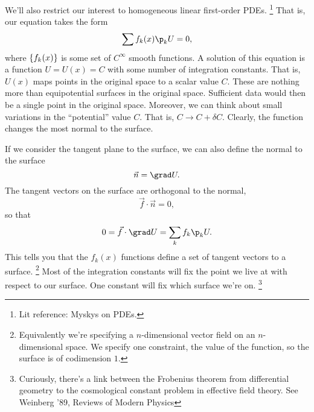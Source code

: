 We'll also restrict our interest to homogeneous linear first-order PDEs.%
    \footnote{Lit reference: Myskys on PDEs.}
That is, our equation takes the form
\begin{equation}
    \sum f_k(x) \p_k U = 0,
\end{equation}
where $\{f_k(x)\}$ is some set of $C^\infty$ smooth functions. A solution of this equation is a function $U=U(x)=C$ with some number of integration constants.
That is, $U(x)$ maps points in the original space to a scalar value $C$. These are nothing more than equipotential surfaces in the original space. Sufficient data would then be a single point in the original space. Moreover, we can think about small variations in the ``potential'' value $C$. That is, $C\to C+\delta C$. Clearly, the function changes the most normal to the surface.

If we consider the tangent plane to the surface, we can also define the normal to the surface
\begin{equation}
    \vec n = \grad U.
\end{equation}
The tangent vectors on the surface are orthogonal to the normal,
\begin{equation}
    \vec f \cdot \vec n = 0,
\end{equation}
so that
\begin{equation}
    0=\vec f \cdot \grad U = \sum_k f_k \p_k U.
\end{equation}
This tells you that the $f_k(x)$ functions define a set of tangent vectors to a surface.%
    \footnote{Equivalently we're specifying a $n$-dimensional vector field on an $n$-dimensional space. We specify one constraint, the value of the function, so the surface is of codimension $1$.}
Most of the integration constants will fix the point we live at with respect to our surface. One constant will fix which surface we're on.%
    \footnote{Curiously, there's a link between the Frobenius theorem from differential geometry to the cosmological constant problem in effective field theory. See Weinberg '89, Reviews of Modern Physics}

